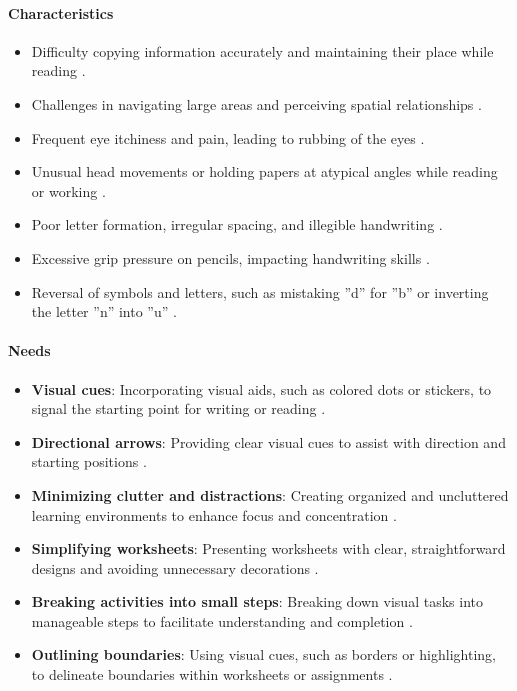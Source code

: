 \paragraph{Characteristics}
\begin{itemize}
    \item Difficulty copying information accurately and maintaining their place while reading \cite{Speechify}.
    \item Challenges in navigating large areas and perceiving spatial relationships \cite{Speechify}.
    \item Frequent eye itchiness and pain, leading to rubbing of the eyes \cite{Speechify}.
    \item Unusual head movements or holding papers at atypical angles while reading or working \cite{Speechify}.
    \item Poor letter formation, irregular spacing, and illegible handwriting \cite{Speechify}.
    \item Excessive grip pressure on pencils, impacting handwriting skills \cite{Speechify}.
    \item Reversal of symbols and letters, such as mistaking ''d'' for ''b'' or inverting the letter ''n'' into ''u'' \cite{Speechify}.
\end{itemize}

\paragraph{Needs}
\begin{itemize}
    \item \textbf{Visual cues}: Incorporating visual aids, such as colored dots or stickers, to signal the starting point for writing or reading \cite{ChildDevelopment}.
    \item \textbf{Directional arrows}: Providing clear visual cues to assist with direction and starting positions \cite{ChildDevelopment}.
    \item \textbf{Minimizing clutter and distractions}: Creating organized and uncluttered learning environments to enhance focus and concentration \cite{ChildDevelopment}.
    \item \textbf{Simplifying worksheets}: Presenting worksheets with clear, straightforward designs and avoiding unnecessary decorations \cite{ChildDevelopment}.
    \item \textbf{Breaking activities into small steps}: Breaking down visual tasks into manageable steps to facilitate understanding and completion \cite{ChildDevelopment}.
    \item \textbf{Outlining boundaries}: Using visual cues, such as borders or highlighting, to delineate boundaries within worksheets or assignments \cite{ChildDevelopment}.
\end{itemize}
